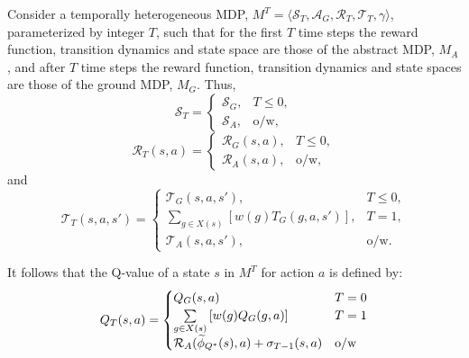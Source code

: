 Consider a temporally heterogeneous \ac{MDP}, $M^T = \langle \mathcal{S}_T, \mathcal{A}_G, \mathcal{R}_T, \mathcal{T}_T, \gamma \rangle$, parameterized by integer $T$, such that for the first $T$ time steps the reward function, transition dynamics and state space are those of the abstract MDP, $M_A$, and after $T$ time steps the reward function, transition dynamics and state spaces are those of the ground MDP, $M_G$. Thus,
\begin{equation}
\mathcal{S}_T = \begin{cases}
\mathcal{S}_G,& T \leq 0, \\
\mathcal{S}_A,& \text{o/w},
\end{cases}
\end{equation}
\begin{equation}
\mathcal{R}_T(s,a) = \begin{cases}
\mathcal{R}_G(s,a),& T \leq 0, \\
\mathcal{R}_A(s, a),& \text{o/w},
\end{cases}
\end{equation}
and
\begin{equation}
\mathcal{T}_T(s,a,s') = \begin{cases}
\mathcal{T}_G(s,a,s'),& T \leq 0, \\
\underset{{g \in X(s)}}{\sum}\left[w(g)T_G(g, a, s')\right],& T = 1, \\
\mathcal{T}_A(s,a,s'),& \text{o/w}.
\end{cases}
\end{equation}

It follows that the Q-value of a state $s$ in $M^T$ for action $a$ is defined by:
\begin{equation}
Q_T(s, a) = 
\begin{cases}
	   Q_G(s, a) &  T=0\\
	   \underset{g \in X(s)}{\sum} \left[ w(g)Q_G(g,a) \right] & T = 1\\
	   \mathcal{R}_A(\widetilde \phi_{Q^*}(s),a) + \sigma_{T-1}(s,a) &\text{o/w}

\end{cases}
\end{equation}

